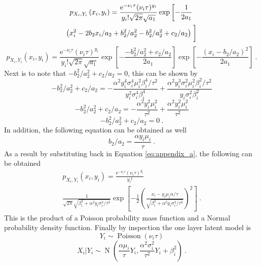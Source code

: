 \documentclass[12pt]{report}
\DeclareMathOperator{\normal}{N}
\DeclareMathOperator{\poisson}{Poisson}
\newcommand{\euler}{\mathrm{e}}
\begin{document}
\begin{multline*}
p_{X_i,Y_i}\left(x_i,y_i\right)=\frac{\euler^{-\nu_i\tau}(\nu_i\tau)^{y_i}}{y_i!\sqrt{2\pi}\sqrt{a_1}}
\exp\left[-\frac{1}{2a_1}
\right.
\\
\left(x_i^2-2b_2x_i/a_2+b_2^2/a_2^2-b_2^2/a_2^2+c_2/a_2\right)
\left.\vphantom{-\frac{1}{2a_1}}\right]
\end{multline*}
\begin{equation*}
p_{X_i,Y_i}\left(x_i,y_i\right)=\frac{\euler^{-\nu_i\tau}(\nu_i\tau)^{y_i}}{y_i!\sqrt{2\pi}\sqrt{a_1}}
\exp\left[-\frac{-b_2^2/a_2^2+c_2/a_2}{2a_1}\right]
\exp\left[-\frac{(x_i-b_2/a_2)^2}{2a_1}
\right] \ .
\end{equation*}
Next is to note that $-b_2^2/a_2^2+c_2/a_2=0$, this can be shown by
\begin{equation*}
-b_2^2/a_2^2+c_2/a_2 = 
-\frac{\alpha^2 y_i^4\sigma_i^4\mu_i^2\beta_i^4/\tau^2}{y_i^2\sigma_i^4\beta_i^4}
+
\frac{\alpha^2y_i^3\sigma_i^2\mu_i^2\beta_i^2/\tau^2}{y_i\sigma_i^2\beta_i^2}
\end{equation*}
\begin{equation*}
-b_2^2/a_2^2+c_2/a_2 = -\frac{\alpha^2 y_i^2\mu_i^2}{\tau^2}
+
\frac{\alpha^2y_i^2\mu_i^2}{\tau^2}
\end{equation*}
\begin{equation}
-b_2^2/a_2^2+c_2/a_2 = 0 \ .
\end{equation}
In addition, the following equation can be obtained as well
\begin{equation}
b_2/a_2 = \frac{\alpha y_i \mu_i}{\tau} \ .
\end{equation}
As a result by substituting back in Equation \eqref{eq:appendix_a}, the following can be obtained
\begin{multline}
p_{X_i,Y_i}\left(x_i,y_i\right)=
\frac{\euler^{-\nu_i\tau}(\nu_i\tau)^{y_i}}{y_i!}
\\
\frac{1}{\sqrt{2\pi}\sqrt{\beta_i^2+\alpha^2y_i\sigma_i^2/\tau^2}}
\exp\left[-\frac{1}{2}\left(\frac{x_i-y_i\mu_i\alpha/\tau}{\sqrt{\beta_i^2+\alpha^2y_i\sigma_i^2/\tau^2}}\right)^2\right] \ .
\end{multline}
This is the product of a Poisson probability mass function and a Normal probability density function. Finally by inspection the one layer latent model is
\begin{equation}
Y_i\sim\poisson(\nu_i\tau)
\end{equation}
\begin{equation}
X_i|Y_i\sim\normal\left(
\frac{\alpha\mu_i}{\tau}Y_i,\frac{\alpha^2\sigma_i^2}{\tau^2}Y_i+\beta_i^2
\right) \ .
\end{equation}
\end{document}
